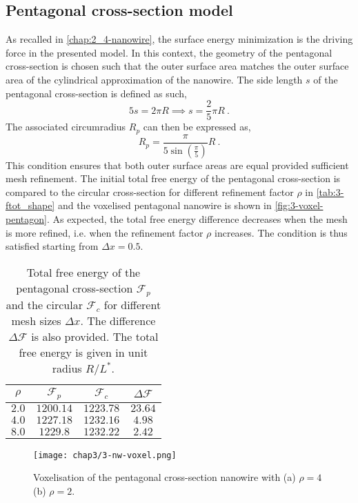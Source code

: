 \subsection{Pentagonal cross-section model}
As recalled in \autoref{chap:2_4-nanowire}, the surface energy minimization is the driving force in the presented model. In this context, the geometry of the pentagonal cross-section is chosen such that the outer surface area matches the outer surface area of the cylindrical approximation of the nanowire. The side length $s$ of the pentagonal cross-section is defined as such,
\begin{equation}
    5 s = 2 \pi R \implies s = \frac{2}{5}\pi R \ .
\end{equation}
The associated circumradius $R_p$ can then be expressed as,
\begin{equation}
    R_p = \frac{\pi}{5 \sin\left(\frac{\pi}{5}\right)} R \ .
\end{equation}
This condition ensures that both outer surface areas are equal provided sufficient mesh refinement. The initial total free energy of the pentagonal cross-section is compared to the circular cross-section for different refinement factor $\rho$ in \autoref{tab:3-ftot_shape} and the voxelised pentagonal nanowire is shown in \autoref{fig:3-voxel-pentagon}. As expected, the total free energy difference decreases when the mesh is more refined, i.e. when the refinement factor $\rho$ increases. The condition is thus satisfied starting from $\Delta x=0.5$.

   \begin{table}[H]
        \centering
        \begin{tabular}{cccc}
            \hline
            $\rho$ & $\mathcal{F}_p$ & $\mathcal{F}_c$ & $\Delta \mathcal{F}$\\
            \hline
            $2.0$   & $1200.14$ & $1223.78$   & $23.64$ \\
            $4.0$   & $1227.18$ & $1232.16$   & $4.98$ \\
            $8.0$  & $1229.8$ & $1232.22$   & $2.42$ \\
            \hline
        \end{tabular}
        \caption{Total free energy of the pentagonal cross-section $\mathcal{F}_p$ and the circular $\mathcal{F}_c$ for different mesh sizes $\Delta x$. The difference $\Delta \mathcal{F}$ is also provided. The total free energy is given in unit radius $R/L^*$.}
        \label{tab:3-ftot_shape}
    \end{table}

\begin{figure}[H]
    \centering
    \texttt{[image: chap3/3-nw-voxel.png]}
    \caption{Voxelisation of the pentagonal cross-section nanowire with (a) $\rho = 4$ (b) $\rho = 2$.}
    \label{fig:3-voxel-pentagon}
\end{figure}


